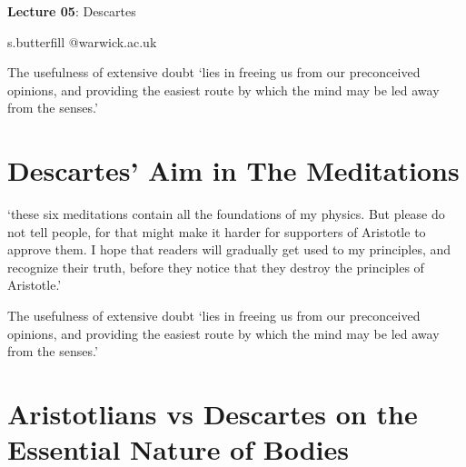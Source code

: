 \documentclass[12pt]{extarticle}
\date{}
\makeatletter
\def \ititle {Descartes}
\def \isubtitle {Lecture 02}
\def \iemail{s.butterfill @warwick.ac.uk}
\makeatother
\begin{document}
\begin{multicols*}{3}

\setlength\footnotesep{1em}











      
\def \ititle {Lecture 05}
 
\def \isubtitle {Descartes}
 
\begin{center}
 
{\Large
 
\textbf{\ititle}: \isubtitle
 
}
 
 
 
\iemail %
 
\end{center}
 
The usefulness of extensive doubt ‘lies in freeing us from our preconceived opinions,  and providing the easiest route by which the mind may be  led away from the senses.’
 
 
 
\section{Descartes’ Aim in The Meditations}
 
‘these six meditations contain all the foundations of my physics.  But please do not tell people, for that might make it harder for supporters of Aristotle to approve them.  I hope that readers will gradually get used to my principles, and recognize their truth,  before they notice that  they destroy the principles of Aristotle.’ 
 
The usefulness of extensive doubt ‘lies in freeing us from our preconceived opinions,  and providing the easiest route by which the mind may be  led away from the senses.’
 
 
 
\section{Aristotlians vs Descartes on the Essential Nature of Bodies}
 

\end{multicols*}
\end{document}
